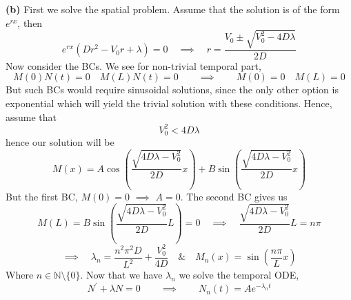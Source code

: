 \documentclass[10pt]{article}
\begin{document}
\textbf{(b)}
First we solve the spatial problem. Assume that the solution is of the form $e^{rx}$, then
$$e^{rx}\left(Dr^{2} - V_{0}r + \lambda\right) = 0 \hspace{1em} \implies \hspace{1em} r = \frac{V_{0} \pm \sqrt{V_{0}^{2} - 4D\lambda}}{2D}$$
Now consider the BCs. We see for non-trivial temporal part,
$$M(0)N(t) = 0 \hspace{1em} M(L)N(t) = 0 \hspace{2em} \implies \hspace{2em} M(0) = 0 \hspace{1em} M(L) = 0$$
But such BCs would require sinusoidal solutions, since the only other option is exponential which will yield the trivial solution with these conditions. Hence, assume that
$$V_{0}^{2} < 4D\lambda$$
hence our solution will be
$$M(x) = A\cos\left(\frac{\sqrt{4D\lambda - V_{0}^{2}}}{2D}x\right) + B\sin\left(\frac{\sqrt{4D\lambda - V_{0}^{2}}}{2D}x\right)$$
But the first BC, $M(0) = 0$ $\implies$ $A = 0$. The second BC gives us
$$M(L) = B\sin\left(\frac{\sqrt{4D\lambda - V_{0}^{2}}}{2D}L\right) = 0 \hspace{1em} \implies \hspace{1em} \frac{\sqrt{4D\lambda - V_{0}^{2}}}{2D}L = n\pi$$
$$\implies \hspace{1em} \lambda_{n} = \frac{n^{2}\pi^{2}D}{L^{2}} + \frac{V_{0}^{2}}{4D} \hspace{1em} \& \hspace{1em} M_{n}(x) = \sin\left(\frac{n\pi}{L}x\right)$$
Where $n \in \mathbb{N} \setminus \{0\}$. Now that we have $\lambda_{n}$ we solve the temporal ODE,
$$N^{\prime} + \lambda N = 0 \hspace{2em} \implies \hspace{2em} N_{n}(t) = Ae^{-\lambda_{n}t}$$
\end{document}
